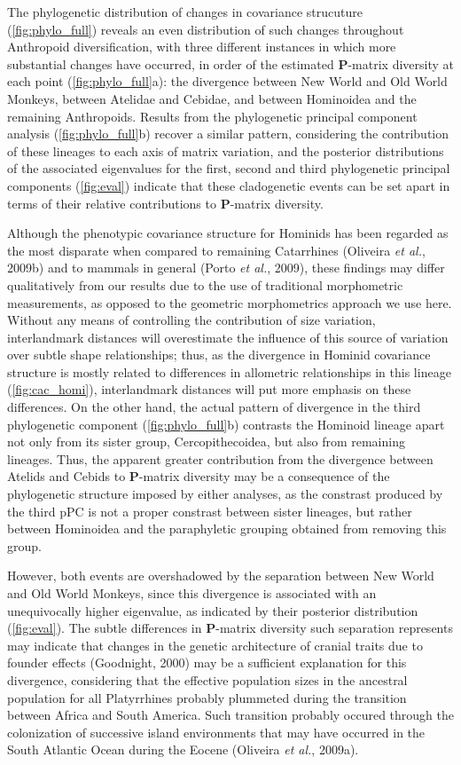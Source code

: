 \documentclass[12pt,twoside]{report}
\begin{document}
The phylogenetic distribution of changes in covariance strucuture
(\autoref{fig:phylo_full}) reveals an even distribution of such changes
throughout Anthropoid diversification, with three different instances in
which more substantial changes have occurred, in order of the estimated
$\mathbf{P}$-matrix diversity at each point (\autoref{fig:phylo_full}a):
the divergence between New World and Old World Monkeys, between Atelidae
and Cebidae, and between Hominoidea and the remaining Anthropoids.
Results from the phylogenetic principal component analysis
(\autoref{fig:phylo_full}b) recover a similar pattern, considering the
contribution of these lineages to each axis of matrix variation, and the
posterior distributions of the associated eigenvalues for the first,
second and third phylogenetic principal components (\autoref{fig:eval})
indicate that these cladogenetic events can be set apart in terms of
their relative contributions to $\mathbf{P}$-matrix diversity.

Although the phenotypic covariance structure for Hominids has been
regarded as the most disparate when compared to remaining Catarrhines
(Oliveira \emph{et al.}, 2009b) and to mammals in general (Porto
\emph{et al.}, 2009), these findings may differ qualitatively from our
results due to the use of traditional morphometric measurements, as
opposed to the geometric morphometrics approach we use here. Without any
means of controlling the contribution of size variation, interlandmark
distances will overestimate the influence of this source of variation
over subtle shape relationships; thus, as the divergence in Hominid
covariance structure is mostly related to differences in allometric
relationships in this lineage (\autoref{fig:cac_homi}), interlandmark
distances will put more emphasis on these differences. On the other
hand, the actual pattern of divergence in the third phylogenetic
component (\autoref{fig:phylo_full}b) contrasts the Hominoid lineage
apart not only from its sister group, Cercopithecoidea, but also from
remaining lineages. Thus, the apparent greater contribution from the
divergence between Atelids and Cebids to $\mathbf{P}$-matrix diversity
may be a consequence of the phylogenetic structure imposed by either
analyses, as the constrast produced by the third pPC is not a proper
constrast between sister lineages, but rather between Hominoidea and the
paraphyletic grouping obtained from removing this group.

However, both events are overshadowed by the separation between New
World and Old World Monkeys, since this divergence is associated with an
unequivocally higher eigenvalue, as indicated by their posterior
distribution (\autoref{fig:eval}). The subtle differences in
$\mathbf{P}$-matrix diversity such separation represents may indicate
that changes in the genetic architecture of cranial traits due to
founder effects (Goodnight, 2000) may be a sufficient explanation for
this divergence, considering that the effective population sizes in the
ancestral population for all Platyrrhines probably plummeted during the
transition between Africa and South America. Such transition probably
occured through the colonization of successive island environments that
may have occurred in the South Atlantic Ocean during the Eocene
(Oliveira \emph{et al.}, 2009a).
\end{document}
